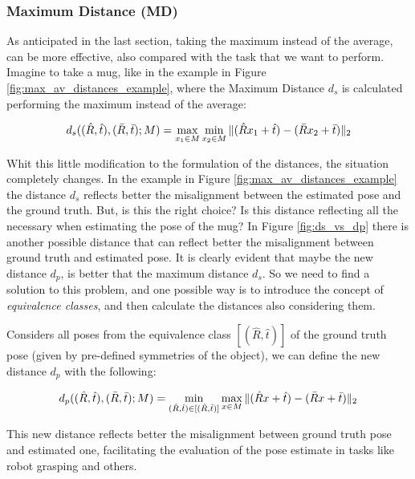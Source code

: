 \subsubsection{Maximum Distance (MD)}\label{subsubsec:average_distance}
As anticipated in the last section, taking the maximum instead of the average, can be more effective, also compared with the task that we want to perform. Imagine to take a mug, like in the example in Figure \ref{fig:max_av_distances_example}, where the Maximum Distance $d_s$ is calculated performing the maximum instead of the average:

\begin{equation}
    \label{eq:maximum_distance}
    d_s((\hat{R}, \hat{t}), (\bar{R}, \bar{t}); M) = \max_{x_1 \in M} \min_{x_2 \in M} \|{(\hat{R}x_1 + \hat{t}) - (\bar{R}x_2 + \bar{t})}\|_2
\end{equation}

Whit this little modification to the formulation of the distances, the situation completely changes. In the example in Figure \ref{fig:max_av_distances_example} the distance $d_s$ reflects better the misalignment between the estimated pose and the ground truth. But, is this the right choice? Is this distance reflecting all the necessary when estimating the pose of the mug? In Figure \ref{fig:ds_vs_dp} there is another possible distance that can reflect better the misalignment between ground truth and estimated pose. It is clearly evident that maybe the new distance $d_p$, is better that the maximum distance $d_s$. So we need to find a solution to this problem, and one possible way is to introduce the concept of \emph{equivalence classes}, and then calculate the distances also considering them.

Considers all poses from the equivalence class $[(\hat{R}, \hat{t})]$ of the ground truth pose (given by pre-defined symmetries of the object), we can define the new distance $d_p$ with the following:

\begin{equation}
    \label{eq:maximum_distance_eq_classes}
    d_p((\hat{R}, \hat{t}), (\bar{R}, \bar{t}); M) = \min_{(\hat{R}, \hat{t}) \in [(\hat{R}, \hat{t})]} \max_{x \in M} \|{(\hat{R}x + \hat{t}) - (\bar{R}x + \bar{t})}\|_2
\end{equation}

This new distance reflects better the misalignment between ground truth pose and estimated one, facilitating the evaluation of the pose estimate in tasks like robot grasping and others.

